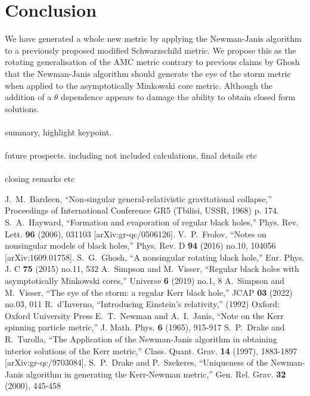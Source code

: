\documentclass[12pt]{iopart}
\begin{document}
\section{Conclusion}
We have generated a whole new metric by applying the Newman-Janis algorithm to a previously proposed modified Schwarzschild metric. We propose this as the rotating generalisation of the AMC metric contrary to previous claims by Ghosh that the Newman-Janis algorithm should generate the eye of the storm metric when applied to the asymptotically Minkowski core metric. Although the addition of a $\theta$ dependence appears to damage the ability to obtain closed form solutions.
\\
\\
summary, highlight keypoint.
\\
\\





future prospects. including not included calculations, final details etc
\\
\\
closing remarks etc
\pagebreak







\begin{thebibliography}{99}
J.~M.~Bardeen,
``Non-singular general-relativistic gravitational collapse,''
Proceedings of International Conference GR5 (Tbilisi, USSR, 1968) p. 174.
S.~A.~Hayward,
``Formation and evaporation of regular black holes,''
Phys. Rev. Lett. \textbf{96} (2006), 031103
[arXiv:gr-qc/0506126].
V.~P.~Frolov,
``Notes on nonsingular models of black holes,''
Phys. Rev. D \textbf{94} (2016) no.10, 104056
[arXiv:1609.01758].
S.~G.~Ghosh,
``A nonsingular rotating black hole,''
Eur. Phys. J. C \textbf{75} (2015) no.11, 532
A.~Simpson and M.~Visser,
``Regular black holes with asymptotically Minkowski cores,''
Universe \textbf{6} (2019) no.1, 8
A.~Simpson and M.~Visser,
``The eye of the storm: a regular Kerr black hole,''
JCAP \textbf{03} (2022) no.03, 011
R.~d'Inverno,
``Introducing Einstein's relativity,''
(1992)
Oxford: Oxford University Press
E.~T.~Newman and A.~I.~Janis,
``Note on the Kerr spinning particle metric,''
J. Math. Phys. \textbf{6} (1965), 915-917
S.~P.~Drake and R.~Turolla,
``The Application of the Newman-Janis algorithm in obtaining interior solutions of the Kerr metric,''
Class. Quant. Grav. \textbf{14} (1997), 1883-1897
[arXiv:gr-qc/9703084].
S.~P.~Drake and P.~Szekeres,
``Uniqueness of the Newman-Janis algorithm in generating the Kerr-Newman metric,''
Gen. Rel. Grav. \textbf{32} (2000), 445-458
\end{thebibliography}
\end{document}
